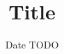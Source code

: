 \documentclass[%
   11pt,              %
   ngerman,           %
   a4paper,           %
]{scrartcl}%
\title{Title}
\author{${AUTHOR}} %
\date{Date TODO}
\begin{document}
\maketitle

\exercise
\subexercise
\end{document}
